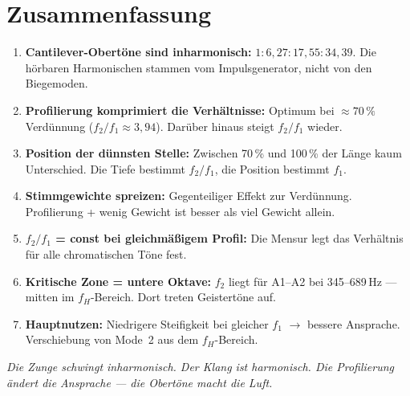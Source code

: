 \documentclass[11pt,a4paper]{article}
\begin{document}
\section{Zusammenfassung}

\begin{enumerate}
\item \textbf{Cantilever-Obertöne sind inharmonisch:}
  $1 : 6{,}27 : 17{,}55 : 34{,}39$. Die hörbaren Harmonischen stammen
  vom Impulsgenerator, nicht von den Biegemoden.
\item \textbf{Profilierung komprimiert die Verhältnisse:} Optimum bei
  $\approx 70\,\%$ Verdünnung ($f_2/f_1 \approx 3{,}94$). Darüber hinaus
  steigt $f_2/f_1$ wieder.
\item \textbf{Position der dünnsten Stelle:} Zwischen 70\,\% und 100\,\% der
  Länge kaum Unterschied. Die Tiefe bestimmt $f_2/f_1$, die Position
  bestimmt $f_1$.
\item \textbf{Stimmgewichte spreizen:} Gegenteiliger Effekt zur Verdünnung.
  Profilierung + wenig Gewicht ist besser als viel Gewicht allein.
\item \textbf{$f_2/f_1$ = const bei gleichmäßigem Profil:} Die Mensur
  legt das Verhältnis für alle chromatischen Töne fest.
\item \textbf{Kritische Zone = untere Oktave:} $f_2$ liegt für A1--A2
  bei 345--689\,Hz --- mitten im $f_H$-Bereich. Dort treten Geistertöne auf.
\item \textbf{Hauptnutzen:} Niedrigere Steifigkeit bei gleicher $f_1$
  $\to$ bessere Ansprache. Verschiebung von Mode~2 aus dem $f_H$-Bereich.
\end{enumerate}

\bigskip
\textit{Die Zunge schwingt inharmonisch. Der Klang ist harmonisch.
Die Profilierung ändert die Ansprache --- die Obertöne macht die Luft.}
\end{document}
